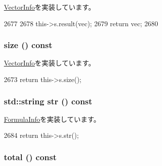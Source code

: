 \hyperlink{classStats_1_1VectorInfo_a7fcf57115122663db42f39cc18ca0f62}{VectorInfo}を実装しています。


\begin{DoxyCode}
2677     {
2678         this->s.result(vec);
2679         return vec;
2680     }
\end{DoxyCode}
\hypertarget{classStats_1_1FormulaInfoProxy_a503ab01f6c0142145d3434f6924714e7}{
\subsubsection[{size}]{ size () const}}
\label{classStats_1_1FormulaInfoProxy_a503ab01f6c0142145d3434f6924714e7}


\hyperlink{classStats_1_1VectorInfo_a4051d143efd31726fa13df03ae4e1bce}{VectorInfo}を実装しています。


\begin{DoxyCode}
2673 { return this->s.size(); }
\end{DoxyCode}
\hypertarget{classStats_1_1FormulaInfoProxy_a1b9b8885b0880fc4ddf9a2c7d1ca3dc4}{
\subsubsection[{str}]{\setlength{\rightskip}{0pt plus 5cm}std::string str () const}}
\label{classStats_1_1FormulaInfoProxy_a1b9b8885b0880fc4ddf9a2c7d1ca3dc4}


\hyperlink{classStats_1_1FormulaInfo_a6522bc65bd97a6b1ef6cdfe78462a919}{FormulaInfo}を実装しています。


\begin{DoxyCode}
2684 { return this->s.str(); }
\end{DoxyCode}
\hypertarget{classStats_1_1FormulaInfoProxy_a35c6e2ed3fc81b40d69052a062113ead}{
\subsubsection[{total}]{ total () const}}
\label{classStats_1_1FormulaInfoProxy_a35c6e2ed3fc81b40d69052a062113ead}


